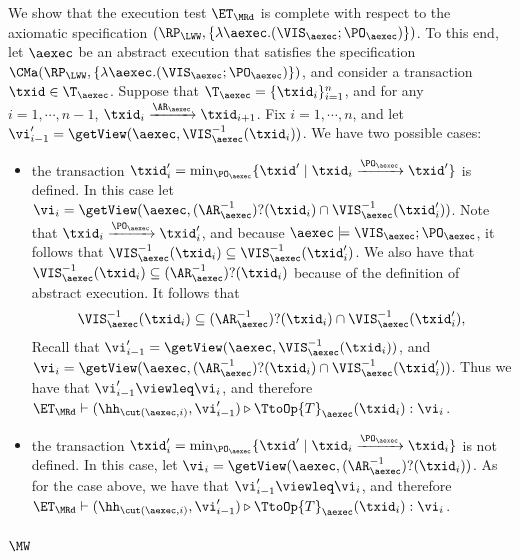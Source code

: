 We show that the execution test $\ET_{\MRd}$ is complete 
with respect to the axiomatic specification $(\RP_{\LWW}, \{\lambda \aexec.(\VIS_{\aexec};\PO_{\aexec})\})$. 
To this end, let $\aexec$ be an abstract execution that satisfies the specification
$\CMa(\RP_{\LWW}, \{\lambda \aexec.(\VIS_{\aexec};\PO_{\aexec})\})$, 
and consider a transaction $\txid \in \T_{\aexec}$. 
Suppose that $\T_{\aexec} = \{\txid_{i}\}_{i=1}^{n}$, and for any $i=1,\cdots, n-1$,
$\txid_{i} \xrightarrow{\AR_{\aexec}} \txid_{i+1}$.
Fix $i=1,\cdots,n$, and let $\vi'_{i-1} = \getView(\aexec, \VIS^{-1}_{\aexec}(\txid_{i}))$.
We have two possible cases: 
\begin{itemize}
\item the transaction $\txid'_{i} = \min_{\PO_{\aexec}}\{\txid' \mid \txid_{i} \xrightarrow{\PO_{\aexec}} \txid'\}$ is 
defined. In this case let $\vi_{i} =\getView(\aexec, (\AR^{-1}_{\aexec})?(\txid_{i}) \cap \VIS^{-1}_{\aexec}(\txid'_{i}))$. 
Note that $\txid_{i} \xrightarrow{\PO_{\aexec}} \txid'_{i}$, and because $\aexec \models \VIS_{\aexec} ; \PO_{\aexec}$, 
it follows that $\VIS^{-1}_{\aexec}(\txid_{i}) \subseteq \VIS^{-1}_{\aexec}(\txid'_{i})$. 
We also have that $\VIS^{-1}_{\aexec}(\txid_{i}) \subseteq (\AR^{-1}_{\aexec})?(\txid_{i})$ because of 
the definition of abstract execution. It follows that 
\[
\VIS^{-1}_{\aexec}(\txid_{i}) \subseteq (\AR^{-1}_{\aexec})?(\txid_{i}) \cap \VIS^{-1}_{\aexec}(\txid'_{i}),
\]
Recall that  $\vi'_{i-1} = \getView(\aexec, \VIS^{-1}_{\aexec}(\txid_{i}))$, 
and $\vi_{i} =\getView(\aexec, (\AR^{-1}_{\aexec})?(\txid_{i}) \cap \VIS^{-1}_{\aexec}(\txid'_{i}))$. 
Thus we have that $\vi'_{i-1} \viewleq \vi_{i}$, and therefore $\ET_{\MRd} \vdash (\hh_{\cut(\aexec, i)}, \vi'_{i-1}) 
\triangleright \TtoOp{T}_{\aexec}(\txid_{i}) : \vi_{i}$. 
\item the transaction $\txid'_{i} = \min_{\PO_{\aexec}}\{\txid' \mid \txid_{i} \xrightarrow{\PO_{\aexec}} \txid_{i}\}$ 
is not defined. In this case, let $\vi_{i} = \getView(\aexec, (\AR^{-1}_{\aexec})?(\txid_{i}))$. 
As for the case above, we have that $\vi'_{i-1} \viewleq \vi_{i}$, and therefore 
$\ET_{\MRd} \vdash (\hh_{\cut(\aexec, i)}, \vi'_{i-1}) \triangleright \TtoOp{T}_{\aexec}(\txid_{i}) : \vi_{i}$. 
\end{itemize}

\subsubsection{\( \MW \)}

\label{sec:sound-complete-mw}

